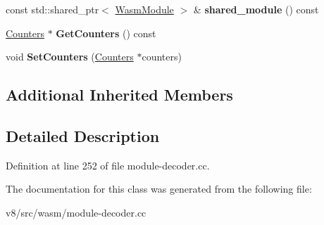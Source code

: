 \begin{DoxyCompactItemize}
\item 
\mbox{\label{classv8_1_1internal_1_1wasm_1_1ModuleDecoderImpl_a40a806c68ff81f663b3b0930087ecc2a}} 
const std\+::shared\+\_\+ptr$<$ \mbox{\hyperlink{structv8_1_1internal_1_1wasm_1_1WasmModule}{Wasm\+Module}} $>$ \& {\bfseries shared\+\_\+module} () const
\item 
\mbox{\label{classv8_1_1internal_1_1wasm_1_1ModuleDecoderImpl_a11cafd9a8896c529f15eb63926c30d8d}} 
\mbox{\hyperlink{classv8_1_1internal_1_1Counters}{Counters}} $\ast$ {\bfseries Get\+Counters} () const
\item 
\mbox{\label{classv8_1_1internal_1_1wasm_1_1ModuleDecoderImpl_a78c8921b9513f36dfd3bc093724d643f}} 
void {\bfseries Set\+Counters} (\mbox{\hyperlink{classv8_1_1internal_1_1Counters}{Counters}} $\ast$counters)
\end{DoxyCompactItemize}
\subsection*{Additional Inherited Members}


\subsection{Detailed Description}


Definition at line 252 of file module-\/decoder.\+cc.



The documentation for this class was generated from the following file\+:\begin{DoxyCompactItemize}
\item 
v8/src/wasm/module-\/decoder.\+cc\end{DoxyCompactItemize}
